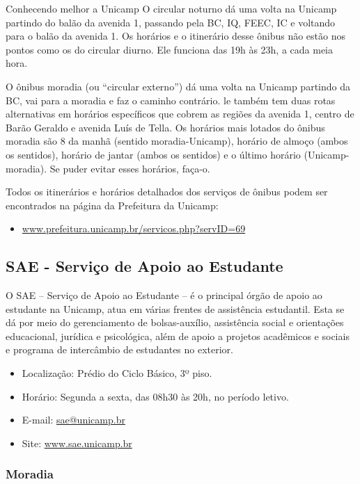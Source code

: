 \begin{story}{Conhecendo melhor a Unicamp}
O circular noturno dá uma volta na Unicamp partindo do balão da avenida 1, passando pela BC, IQ, FEEC, IC e voltando para o balão da avenida 1. Os horários e o itinerário desse ônibus não estão nos pontos como os do circular diurno. Ele funciona das 19h às 23h, a cada meia hora.

O ônibus moradia (ou ``circular externo'') dá uma volta na Unicamp partindo da BC, vai para a moradia e faz o caminho contrário. le também tem duas rotas alternativas em horários específicos que cobrem as regiões da avenida 1, centro de Barão Geraldo e avenida Luís de Tella. Os horários mais lotados do ônibus moradia são 8 da manhã (sentido moradia-Unicamp), horário de almoço (ambos os sentidos), horário de jantar (ambos os sentidos) e o último horário (Unicamp-moradia). Se puder evitar esses horários, faça-o.

Todos os itinerários e horários detalhados dos serviços de ônibus podem ser encontrados na página da Prefeitura da Unicamp:

\begin{itemize}
\item \url{www.prefeitura.unicamp.br/servicos.php?servID=69}
\end{itemize}

\subsection*{SAE - Serviço de Apoio ao Estudante}

O SAE -- Serviço de Apoio ao Estudante -- é o principal órgão de apoio ao estudante na Unicamp, atua em várias frentes de assistência estudantil. Esta se dá por meio do gerenciamento de bolsas-auxílio, assistência social e orientações educacional, jurídica e psicológica, além de apoio a projetos acadêmicos e sociais e programa de intercâmbio de estudantes no exterior.

\begin{itemize}
\item Localização: Prédio do Ciclo Básico, 3º piso.
\item Horário: Segunda a sexta, das 08h30 às 20h, no período letivo.
\item E-mail: \url{sae@unicamp.br}
\item Site: \url{www.sae.unicamp.br}
\end{itemize}

\subsubsection*{Moradia}


\end{story}
